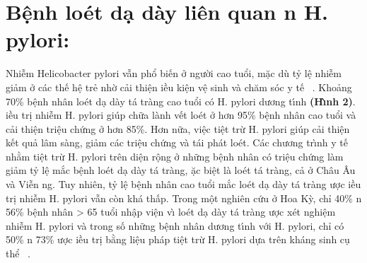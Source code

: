 \documentclass[9pt,twocolumn]{article}
\begin{document}
\section*
  {\textbf{B{\^{\d{e}}}nh lo{\'e}t d{\d{a}} d\`{a}y li{\^{e}}n quan n } \textbf{H. pylori:}}
Nhi{\~{\^e}}m Helicobacter pylori vẫn phổ bi{{\'{\^{e}}}}n ở người cao tuổi, mặc d\`{u} tỷ l{\^{\d{e}}} nhi{\~{\^e}}m  giảm ở c\'{a}c th{{\'{\^{e}}}} h{\^{\d{e}}} trẻ nhờ cải thi{\^{\d{e}}}n \text{\dj}iều ki{\^{\d{e}}}n v{\^{\d{e}}} sinh v\`{a} ch{\u{a}}m s{\'{o}}c y t{{\'{\^{e}}}}\unskip~\cite{2901310:34531807} . Khoảng 70\% b{\^{\d{e}}}nh nh\^{a}n lo{\'e}t d{\d{a}} d\`{a}y t\'{a} tr\`{a}ng cao tuổi c{\'{o}} H. pylori dương t\'{\i}nh \textbf{(H\`{\i}nh 2)}. \text{\DJ}iều tr\d{i} nhi{\~{\^e}}m H. pylori gi\'{u}p chữa l\`{a}nh v{{\'{\^{e}}}}t lo{\'e}t ở hơn 95\% b{\^{\d{e}}}nh nh\^{a}n cao tuổi v\`{a} cải thi{\^{\d{e}}}n tri{\^{\d{e}}}u chứng ở hơn 85\%. Hơn nữa, vi{\^{\d{e}}}c ti{\^{\d{e}}}t trừ H. pylori gi\'{u}p cải thi{\^{\d{e}}}n k{{\'{\^{e}}}}t quả l\^{a}m s\`{a}ng, giảm c\'{a}c tri{\^{\d{e}}}u chứng v\`{a} t\'{a}i ph\'{a}t lo{\'e}t. C\'{a}c chương tr\`{\i}nh y t{{\'{\^{e}}}} nhằm ti{\^{\d{e}}}t trừ H. pylori tr{\^{e}}n di{\^{\d{e}}}n r{\^{\d{o}}}ng ở những b{\^{\d{e}}}nh nh\^{a}n c{\'{o}} tri{\^{\d{e}}}u chứng  l\`{a}m giảm tỷ l{\^{\d{e}}} mắc b{\^{\d{e}}}nh lo{\'e}t d{\d{a}} d\`{a}y t\'{a} tr\`{a}ng, \text{\dj}ặc bi{\^{\d{e}}}t l\`{a} lo{\'e}t t\'{a} tr\`{a}ng, cả ở Ch\^{a}u \^{A}u v\`{a} Vi{\~{\^e}}n ng. Tuy nhi{\^{e}}n, tỷ l{\^{\d{e}}} b{\^{\d{e}}}nh nh\^{a}n cao tuổi mắc lo{\'e}t d{\d{a}} d\`{a}y t\'{a} tr\`{a}ng \text{\dj}ược \text{\dj}iều tr\d{i} nhi{\~{\^e}}m H. pylori vẫn c\`{o}n kh\'{a} thấp. Trong m{\^{\d{o}}}t nghi{\^{e}}n cứu ở Hoa Kỳ, chỉ 40\% n 56\% b{\^{\d{e}}}nh nh\^{a}n {\textgreater} 65 tuổi nh{\^{\d{a}}}p vi{\^{\d{e}}}n v\`{\i} lo{\'e}t d{\d{a}} d\`{a}y t\'{a} tr\`{a}ng \text{\dj}ược x{\'e}t nghi{\^{\d{e}}}m nhi{\~{\^e}}m H. pylori v\`{a} trong số những b{\^{\d{e}}}nh nh\^{a}n dương t\'{\i}nh với H. pylori, chỉ c{\'{o}} 50\% n 73\% \text{\dj}ược \text{\dj}iều tr\d{i} bằng li{\^{\d{e}}}u ph\'{a}p ti{\^{\d{e}}}t trừ H. pylori dựa tr{\^{e}}n kh\'{a}ng sinh c\d{u} thể\unskip~\cite{2901310:34531811} .
    
\end{document}
